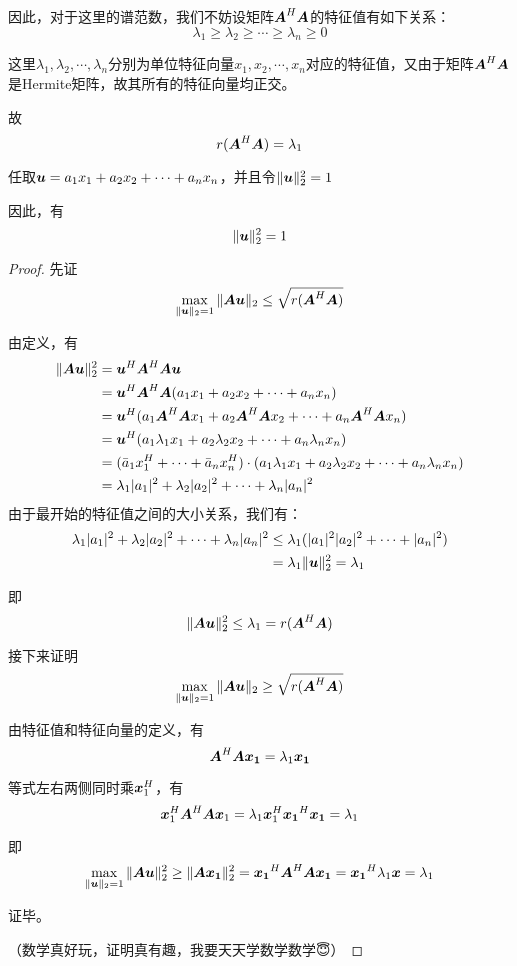 \documentclass[12pt, a4paper, oneside, UTF8]{ctexbook}
\begin{document}
因此，对于这里的谱范数，我们不妨设矩阵$\boldsymbol{A}^H\boldsymbol{A}$的特征值有如下关系：\[\lambda_1\geq\lambda_2\geq\cdots\geq\lambda_n\geq0\]

这里$\lambda_1,\lambda_2,\cdots,\lambda_n$分别为单位特征向量$x_1, x_2,\cdots,x_n$对应的特征值，又由于矩阵$\boldsymbol{A}^H\boldsymbol{A}$是Hermite矩阵，故其所有的特征向量均正交。

故\[r(\boldsymbol{A}^H\boldsymbol{A})=\lambda_1\]

任取$\boldsymbol{u}=a_1x_1+a_2x_2+\cdots+a_nx_n$，并且令$\Vert\boldsymbol{u}\Vert_2^2=1$

因此，有\[\Vert\boldsymbol{u}\Vert_2^2=1\]

\begin{proof}
    先证\[\max\limits_{\Vert\boldsymbol{u}\Vert_2=1}\Vert\boldsymbol{Au}\Vert_2\leq\sqrt{r(\boldsymbol{A}^H\boldsymbol{A})}\]

    由定义，有\[
    \begin{aligned}
    \Vert\boldsymbol{Au}\Vert_2^2&=\boldsymbol{u}^H\boldsymbol{A}^H\boldsymbol{Au}\\
    &=\boldsymbol{u}^H\boldsymbol{A}^H\boldsymbol{A}(a_1x_1+a_2x_2+\cdots+a_nx_n)\\
    &=\boldsymbol{u}^H(a_1\boldsymbol{A}^H\boldsymbol{A}x_1+a_2\boldsymbol{A}^H\boldsymbol{A}x_2+\cdots+a_n\boldsymbol{A}^H\boldsymbol{A}x_n)\\
    &=\boldsymbol{u}^H(a_1\lambda_1x_1+a_2\lambda_2x_2+\cdots+a_n\lambda_nx_n)\\
    &=(\bar{a}_1x_1^H+\cdots+\bar{a}_nx_n^H)\cdot(a_1\lambda_1x_1+a_2\lambda_2x_2+\cdots+a_n\lambda_nx_n)\\
    &=\lambda_1|a_1|^2+\lambda_2|a_2|^2+\cdots+\lambda_n|a_n|^2
    \end{aligned}
    \]
    由于最开始的特征值之间的大小关系，我们有：
    \[\begin{aligned}
    \lambda_1|a_1|^2+\lambda_2|a_2|^2+\cdots+\lambda_n|a_n|^2 &\leq\lambda_1(|a_1|^2|a_2|^2+\cdots+|a_n|^2)\\
    &=\lambda_1\Vert\boldsymbol{u}\Vert_2^2=\lambda_1
    \end{aligned}\]

    即\[\Vert\boldsymbol{Au}\Vert_2^2\leq \lambda_1=r(\boldsymbol{A}^H\boldsymbol{A})\]

    接下来证明\[\max\limits_{\Vert\boldsymbol{u}\Vert_2=1}\Vert\boldsymbol{Au}\Vert_2\geq\sqrt{r(\boldsymbol{A}^H\boldsymbol{A})}\]

    由特征值和特征向量的定义，有\[\boldsymbol{A}^H\boldsymbol{A}\boldsymbol{x_1}=\lambda_1\boldsymbol{x_1}\]

    等式左右两侧同时乘$\boldsymbol{x}_1^H$，有\[\boldsymbol{x}_1^H\boldsymbol{A}^H\boldsymbol{A}\boldsymbol{x}_1=\lambda_1\boldsymbol{x}_1^H\boldsymbol{x_1}^H\boldsymbol{x_1}=\lambda_1\]

    即\[\max\limits_{\Vert\boldsymbol{u}\Vert_2=1}\Vert\boldsymbol{Au}\Vert_2^2\geq\Vert\boldsymbol{Ax_1}\Vert_2^2=\boldsymbol{x_1}^H\boldsymbol{A}^H\boldsymbol{A}\boldsymbol{x_1}=\boldsymbol{x_1}^H\lambda_1\boldsymbol{x}=\lambda_1\]

    证毕。

    （数学真好玩，证明真有趣，我要天天学数学数学😇）
\end{proof}
\end{document}
